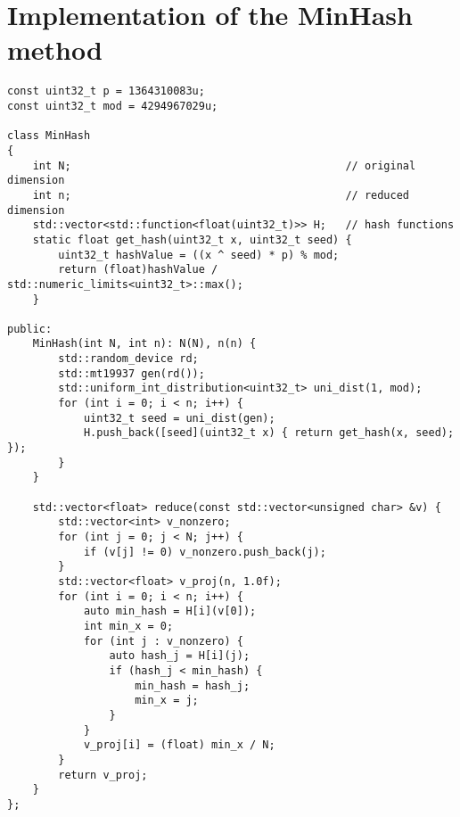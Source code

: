 \section{Implementation of the MinHash method}
\begin{lstlisting}[label=lst:MH_code]
const uint32_t p = 1364310083u;
const uint32_t mod = 4294967029u;

class MinHash
{
    int N;                                           // original dimension
    int n;                                           // reduced dimension
    std::vector<std::function<float(uint32_t)>> H;   // hash functions
    static float get_hash(uint32_t x, uint32_t seed) {
        uint32_t hashValue = ((x ^ seed) * p) % mod;
        return (float)hashValue / std::numeric_limits<uint32_t>::max();
    }

public:
    MinHash(int N, int n): N(N), n(n) {
        std::random_device rd;
        std::mt19937 gen(rd());
        std::uniform_int_distribution<uint32_t> uni_dist(1, mod);
        for (int i = 0; i < n; i++) {
            uint32_t seed = uni_dist(gen);
            H.push_back([seed](uint32_t x) { return get_hash(x, seed); });
        }
    }

    std::vector<float> reduce(const std::vector<unsigned char> &v) {
        std::vector<int> v_nonzero;
        for (int j = 0; j < N; j++) {
            if (v[j] != 0) v_nonzero.push_back(j);
        }
        std::vector<float> v_proj(n, 1.0f);
        for (int i = 0; i < n; i++) {
            auto min_hash = H[i](v[0]);
            int min_x = 0;
            for (int j : v_nonzero) {
                auto hash_j = H[i](j);
                if (hash_j < min_hash) {
                    min_hash = hash_j;
                    min_x = j;
                }
            }
            v_proj[i] = (float) min_x / N;
        }
        return v_proj;
    }
};
\end{lstlisting}

